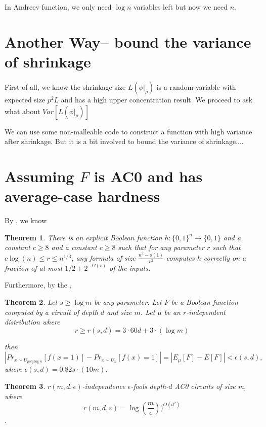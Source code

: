 \documentclass[12pt]{article}
\newtheorem{theorem}{Theorem}[section]
\renewcommand{\.}{,\ldots,}
\begin{document}

In Andreev function, we only need $\log n$ variables left but now we need $n$. 


\section{Another Way-- bound the variance of shrinkage}
First of all, we know the shrinkage size $L(\phi|_{\rho})$ is a random variable with expected size $p^2L$ and has a high upper concentration result. We proceed to ask what about $Var[L(\phi|_\rho)]$

We can use some non-malleable code to construct a function with high variance after shrinkage. But it is a bit involved to bound the variance of shrinkage....
\section{Assuming $F$ is AC0 and has average-case hardness }
\label{sec:AC0} 
By \cite{komargodski2013improved}, we know 
\begin{theorem}
There is an explicit Boolean function $h:\{0,1\}^n\rightarrow \{0,1\}$ and a constant $c\geq 8$ and a constant $c\geq 8$ such that for  any parameter $r$ such that $c\log(n)\leq r\le n^{1/3}$, any formula of size $\frac{n^3-o(1)}{r^2}$ computes $h$ correctly on a fraction of at most $1/2+2^{-\Omega(r)}$ of the inputs. 
\end{theorem}

Furthermore, by the \cite{braverman2010polylogarithmic},
\begin{theorem}
Let $s \ge \log m$ be any parameter. Let $F$ be a Boolean function
computed by a circuit of depth $d$ and size $m$. Let $\mu$ be an $r$-independent distribution
where
$$r \geq  r(s, d) = 3 \cdot 60d+3 \cdot (\log m)$$

then
$$|Pr_{x\sim U_{poly\log n}}[f(x=1)]-Pr_{x\sim U_n}[f(x)=1]|=|E_\mu[F] -E[F]| < \epsilon(s, d),$$
where $\epsilon(s, d) = 0.82s \cdot(10m).$
\end{theorem}
\begin{theorem}
$r(m, d,\epsilon)$-independence $\epsilon$-fools depth-$d$ AC0 circuits of size
m, where
$$r(m, d, ε)=\log(\frac{m}{\epsilon}))^{O(d^2)}$$. 
\end{theorem}
\end{document}
